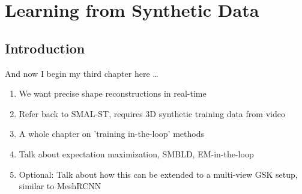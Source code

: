 \chapter{Learning from Synthetic Data}

\ifpdf
    \graphicspath{{Chapter3/Figs/Raster/}{Chapter3/Figs/PDF/}{Chapter3/Figs/}}
\else
    \graphicspath{{Chapter3/Figs/Vector/}{Chapter3/Figs/}}
\fi

\section{Introduction}
And now I begin my third chapter here \dots

\begin{enumerate}
  \item We want precise shape reconstructions in real-time
  \item Refer back to SMAL-ST, requires 3D synthetic training data from video
  \item A whole chapter on 'training in-the-loop' methods
  \item Talk about expectation maximization, SMBLD, EM-in-the-loop
  \item Optional: Talk about how this can be extended to a multi-view GSK setup, similar to MeshRCNN
\end{enumerate}
